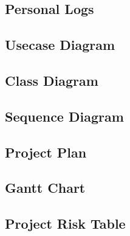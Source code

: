 \documentclass[11pt]{article}
\begin{document}
	\subsection{Personal Logs} %
	\subsection{Usecase Diagram} 
	\subsection{Class Diagram}
	\subsection{Sequence Diagram}
	\subsection{Project Plan} %
	\subsection{Gantt Chart}
	\subsection{Project Risk Table}
\end{document}

